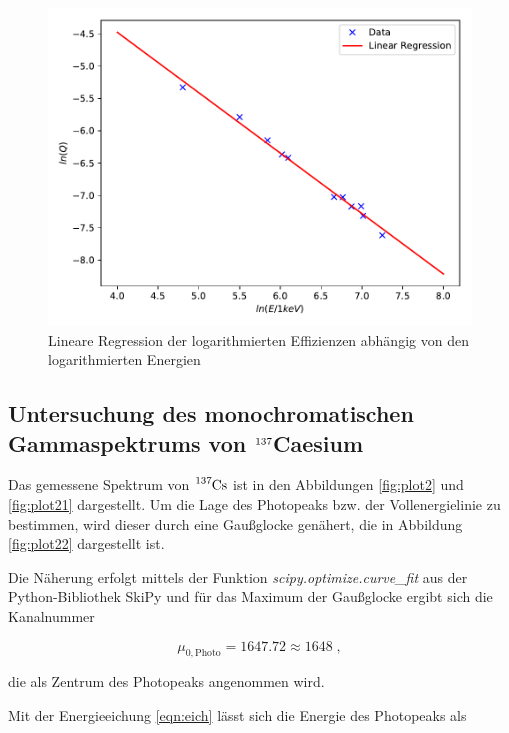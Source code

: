 \begin{figure}[H]
  \centering
  \includegraphics[scale=0.7]{content/plot6.pdf}
  \caption{Lineare Regression der logarithmierten Effizienzen abhängig von den logarithmierten Energien}
  \label{fig:plot6}
\end{figure}


\subsection{Untersuchung des monochromatischen Gammaspektrums von $\ce{^{137}}$Caesium}

Das gemessene Spektrum von $\ce{^{137}Cs}$ ist in den Abbildungen \ref{fig:plot2} und \ref{fig:plot21} dargestellt.
Um die Lage des Photopeaks bzw. der Vollenergielinie zu bestimmen, wird dieser durch eine Gaußglocke genähert, die in Abbildung
\ref{fig:plot22} dargestellt ist.

Die Näherung erfolgt mittels der Funktion \textit{scipy.optimize.curve\_fit} aus der Python-Bibliothek SkiPy und für
das Maximum der Gaußglocke ergibt sich die Kanalnummer

\begin{equation*}
  \mu_{0,\text{Photo}} = \num{1647.72} \approx \num{1648} \; ,
\end{equation*}

die als Zentrum des Photopeaks angenommen wird.

Mit der Energieeichung \eqref{eqn:eich} lässt sich die Energie des Photopeaks als

